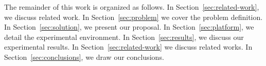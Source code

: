 	The remainder of this work is organized as follows.
	In Section~\ref{sec:related-work}, we discuss related work.
	In Section~\ref{sec:problem} we cover the problem definition.
	In Section~\ref{sec:solution}, we present our proposal.
	In Section~\ref{sec:platform}, we detail the experimental environment.
	In Section~\ref{sec:results}, we discuss our experimental results.
	In Section~\ref{sec:related-work} we discuss related works.
	In Section~\ref{sec:conclusions}, we draw our conclusions.
